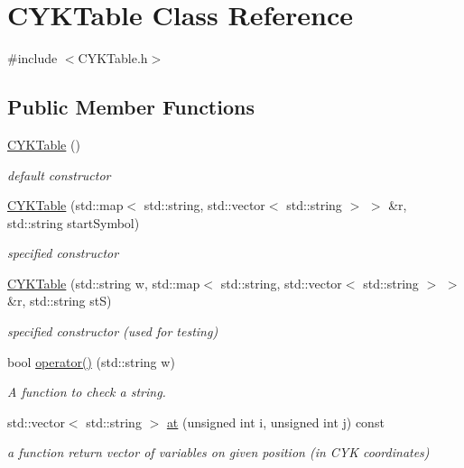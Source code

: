 \hypertarget{classCYKTable}{\section{\-C\-Y\-K\-Table \-Class \-Reference}
\label{d6/dcd/classCYKTable}
}


{\ttfamily \#include $<$\-C\-Y\-K\-Table.\-h$>$}

\subsection*{\-Public \-Member \-Functions}
\begin{DoxyCompactItemize}
\item 
\hyperlink{classCYKTable_ac96905a2f347c63cfda59d55fc97d90a}{\-C\-Y\-K\-Table} ()
\begin{DoxyCompactList}\small\item\em default constructor \end{DoxyCompactList}\item 
\hyperlink{classCYKTable_a9bcbd180cfda8d5c47587f67026d89ad}{\-C\-Y\-K\-Table} (std\-::map$<$ std\-::string, std\-::vector$<$ std\-::string $>$ $>$ \&r, std\-::string start\-Symbol)
\begin{DoxyCompactList}\small\item\em specified constructor \end{DoxyCompactList}\item 
\hyperlink{classCYKTable_abd9ea746b2c4ed848819efbf95645cc4}{\-C\-Y\-K\-Table} (std\-::string w, std\-::map$<$ std\-::string, std\-::vector$<$ std\-::string $>$ $>$ \&r, std\-::string st\-S)
\begin{DoxyCompactList}\small\item\em specified constructor (used for testing) \end{DoxyCompactList}\item 
bool \hyperlink{classCYKTable_ac756a60dc99c8557ad5d11e557b30f57}{operator()} (std\-::string w)
\begin{DoxyCompactList}\small\item\em \-A function to check a string. \end{DoxyCompactList}\item 
std\-::vector$<$ std\-::string $>$ \hyperlink{classCYKTable_a9d53e2b07637d13ed72b97b007a09cf4}{at} (unsigned int i, unsigned int j) const 
\begin{DoxyCompactList}\small\item\em a function return vector of variables on given position (in \-C\-Y\-K coordinates) \end{DoxyCompactList}\item 

\end{DoxyCompactItemize}
